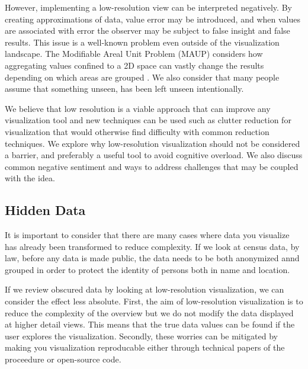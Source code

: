 However, implementing a low-resolution view can be interpreted negatively. By creating approximations of data, value error may be introduced, and when values are associated with error the observer may be subject to false insight and false results. This issue is a well-known problem even outside of the visualization landscape. The Modifiable Areal Unit Problem (MAUP) considers how aggregating values confined to a 2D space can vastly change the results depending on which areas are grouped \cite{openshaw1984modifiable}.
We also consider that many people assume that something unseen, has been left unseen intentionally.

We believe that low resolution is a viable approach that can improve any visualization tool and new techniques can be used such as clutter reduction for visualization that would otherwise find difficulty with common reduction techniques.  We explore why low-resolution visualization should not be considered a barrier, and preferably a useful tool to avoid cognitive overload. We also discuss common negative sentiment and ways to address challenges that may be coupled with the idea.

\subsection{Hidden Data}
It is important to consider that there are many cases where data you visualize has already been transformed to reduce complexity. If we look at census data, by law, before any data is made public, the data needs to be both anonymized annd grouped in order to protect the identity of persons both in name and location. %

If we review obscured data by looking at low-resolution visualization, we can consider the effect less absolute. First, the aim of low-resolution visualization is to reduce the complexity of the overview but we do not modify the data displayed at higher detail views. This means that the true data values can be found if the user explores the visualization. Secondly, these worries can be mitigated by making you visualization reproducable either through technical papers of the proceedure or open-source code. 

